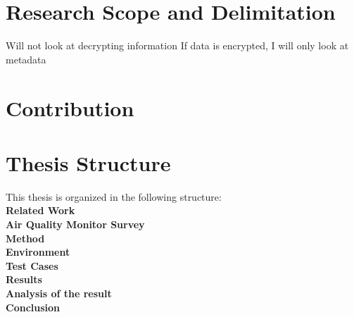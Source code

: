 \section*{Research Scope and Delimitation}
Will not look at decrypting information
If data is encrypted, I will only look at metadata

\section*{Contribution}

\section*{Thesis Structure}
This thesis is organized in the following structure:\\
\textbf{Related Work}
\\
\textbf{Air Quality Monitor Survey}
\\
\textbf{Method}
\\
\textbf{Environment}
\\
\textbf{Test Cases}
\\
\textbf{Results}
\\
\textbf{Analysis of the result}
\\
\textbf{Conclusion}
\\
